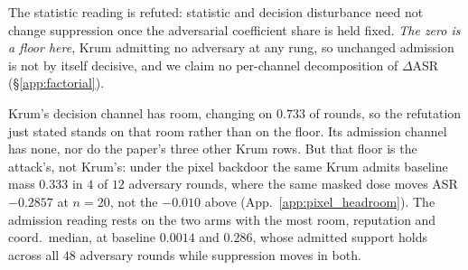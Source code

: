 \documentclass{article}
\begin{document}
\noindent The statistic reading is refuted: statistic and decision disturbance need not change suppression once the adversarial coefficient share is held fixed. \emph{The zero is a floor here}, Krum admitting no adversary at any rung, so unchanged admission is not by itself decisive, and we claim no per-channel decomposition of $\Delta$ASR (§\ref{app:factorial}).

\noindent Krum's decision channel has room, changing on $0.733$ of rounds, so the refutation just stated stands on that room rather than on the floor. Its admission channel has none, nor do the paper's three other Krum rows. But that floor is the attack's, not Krum's: under the pixel backdoor the same Krum admits baseline mass $0.333$ in $4$ of $12$ adversary rounds, where the same masked dose moves ASR $-0.2857$ at $n{=}20$, not the $-0.010$ above (App.~\ref{app:pixel_headroom}). The admission reading rests on the two arms with the most room, reputation and coord.\ median, at baseline $0.0014$ and $0.286$, whose admitted support holds across all $48$ adversary rounds while suppression moves in both.


\end{document}

